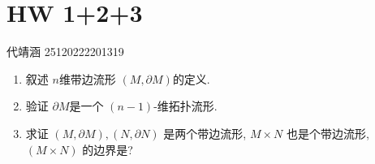 \documentclass[../main.tex]{subfiles}
\begin{document}
\chapter{ HW 1+2+3 }


代靖涵 25120222201319

\begin{exercise}{}{}
    \begin{enumerate}
        \item 叙述 \(  n  \)维带边流形 \(  \left( M,  \partial M \right)   \)的定义.
        \item 验证 \(   \partial M  \)是一个 \(  \left( n-1 \right)   \)-维拓扑流形.    
        \item 求证 $(M, \partial M), (N, \partial N)$ 是两个带边流形, $M \times N$ 也是个带边流形, $(M \times N)$ 的边界是?
    \end{enumerate}
    
\end{exercise}
\end{document}
